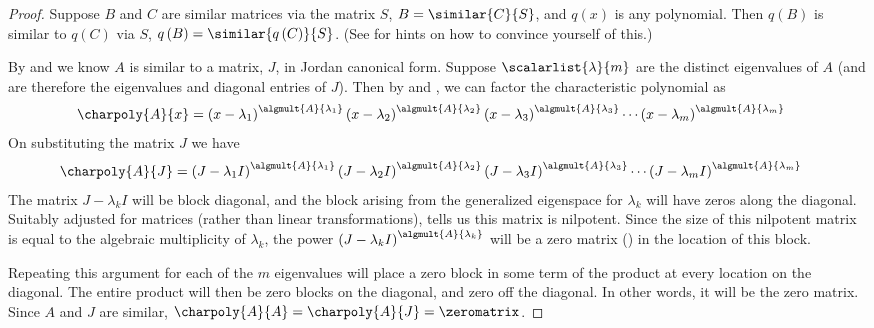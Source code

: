 \begin{proof}
Suppose $B$ and $C$ are similar matrices via the matrix $S$, $B=\similar{C}{S}$, and $q(x)$ is any polynomial.  Then $q\left(B\right)$ is similar to $q\left(C\right)$ via $S$, $q\left(B\right)=\similar{q\left(C\right)}{S}$.  (See  for hints on how to convince yourself of this.)\par
%
By  and  we know $A$ is similar to a matrix, $J$, in Jordan canonical form.  Suppose $\scalarlist{\lambda}{m}$ are the distinct eigenvalues of $A$ (and are therefore the eigenvalues and diagonal entries of $J$).  Then by  and , we can factor the characteristic polynomial as
%
\begin{align*}
\charpoly{A}{x}&=
\left(x-\lambda_1\right)^{\algmult{A}{\lambda_1}}
\left(x-\lambda_2\right)^{\algmult{A}{\lambda_2}}
\left(x-\lambda_3\right)^{\algmult{A}{\lambda_3}}
\cdots
\left(x-\lambda_m\right)^{\algmult{A}{\lambda_m}}
\end{align*}
%
On substituting the matrix $J$ we have
%
\begin{align*}
\charpoly{A}{J}&=
\left(J-\lambda_1 I\right)^{\algmult{A}{\lambda_1}}
\left(J-\lambda_2 I\right)^{\algmult{A}{\lambda_2}}
\left(J-\lambda_3 I\right)^{\algmult{A}{\lambda_3}}
\cdots
\left(J-\lambda_m I\right)^{\algmult{A}{\lambda_m}}
\end{align*}
%
The matrix $J-\lambda_k I$ will be block diagonal, and the block arising from the generalized eigenspace for $\lambda_k$ will have zeros along the diagonal.  Suitably adjusted for matrices (rather than linear transformations),  tells us this matrix is nilpotent.  Since the size of this nilpotent matrix is equal
to the algebraic multiplicity of $\lambda_k$, the power $\left(J-\lambda_k I\right)^{\algmult{A}{\lambda_k}}$ will be a zero matrix () in the location of this block.\par
%
Repeating this argument for each of the $m$ eigenvalues will place a zero block in some term of the product at every location on the diagonal.  The entire product will then be zero blocks on the diagonal, and zero off the diagonal.  In other words, it will be the zero matrix.  Since $A$ and $J$ are similar, $\charpoly{A}{A}=\charpoly{A}{J}=\zeromatrix$.
%
\end{proof}
%
%



